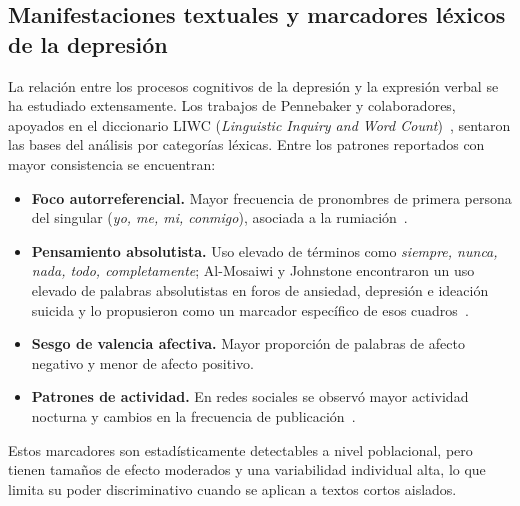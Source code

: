 \documentclass[12pt,a4paper]{article}
\begin{document}
\subsection{Manifestaciones textuales y marcadores léxicos de la depresión}
La relación entre los procesos cognitivos de la depresión y la expresión verbal se ha estudiado extensamente. Los trabajos de Pennebaker y colaboradores, apoyados en el diccionario LIWC (\emph{Linguistic Inquiry and Word Count})~\cite{pennebaker2001liwc}, sentaron las bases del análisis por categorías léxicas. Entre los patrones reportados con mayor consistencia se encuentran:
\begin{itemize}[leftmargin=2em]
    \item \textbf{Foco autorreferencial.} Mayor frecuencia de pronombres de primera persona del singular (\emph{yo, me, mi, conmigo}), asociada a la rumiación~\cite{rude2004language}.
    \item \textbf{Pensamiento absolutista.} Uso elevado de términos como \emph{siempre, nunca, nada, todo, completamente}; Al-Mosaiwi y Johnstone encontraron un uso elevado de palabras absolutistas en foros de ansiedad, depresión e ideación suicida y lo propusieron como un marcador específico de esos cuadros~\cite{almosaiwi2018absolutist}.
    \item \textbf{Sesgo de valencia afectiva.} Mayor proporción de palabras de afecto negativo y menor de afecto positivo.
    \item \textbf{Patrones de actividad.} En redes sociales se observó mayor actividad nocturna y cambios en la frecuencia de publicación~\cite{leis2019detecting,leis2021tesis}.
\end{itemize}
Estos marcadores son estadísticamente detectables a nivel poblacional, pero tienen tamaños de efecto moderados y una variabilidad individual alta, lo que limita su poder discriminativo cuando se aplican a textos cortos aislados.
\end{document}
